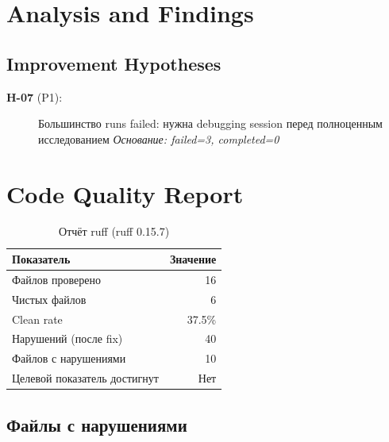 \documentclass[12pt,a4paper]{article}
\begin{document}
\section{Analysis and Findings}





\subsection{Improvement Hypotheses}

\begin{description}
    \item[\textbf{H-07} (P1):] Большинство runs failed: нужна debugging session перед полноценным исследованием
    \textit{Основание: failed=3, completed=0}
\end{description}




\section{Code Quality Report}

\begin{table}[H]
\centering
\caption{Отчёт ruff (ruff 0.15.7)}
\begin{tabular}{lr}
\toprule
Показатель & Значение \\
\midrule
Файлов проверено & 16 \\
Чистых файлов & 6 \\
Clean rate & 37.5\% \\
Нарушений (после fix) & \textcolor{warncolor}{40} \\
Файлов с нарушениями & 10 \\
Целевой показатель достигнут & \textcolor{failcolor}{Нет} \\
\bottomrule
\end{tabular}
\end{table}

\subsection*{Файлы с нарушениями}
\end{document}
